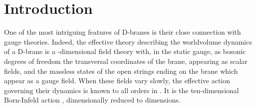 \documentclass[12pt,a4paper]{article}
\begin{document}
\newpage

\pagestyle{plain}

\setcounter{section}{0}
\section{Introduction\label{Intro}}

One of the most intriguing features of D-branes is
their close connection with gauge theories.
Indeed, the effective theory describing the worldvolume dynamics of a
D\coordHE{}-brane is a \coordHE{}-dimensional field theory with, in the static gauge,
as bosonic degrees of freedom the transversal coordinates of the brane,
appearing as \coordHE{} scalar fields, and the massless states of the open strings
ending on the brane which appear as a \coordHE{} gauge field.
When these fields vary slowly, the effective
action governing their dynamics is known to all orders in \coordHE{}.
It is the ten-dimensional
Born-Infeld action \cite{AT}, dimensionally reduced to \coordHE{} dimensions.
\end{document}
